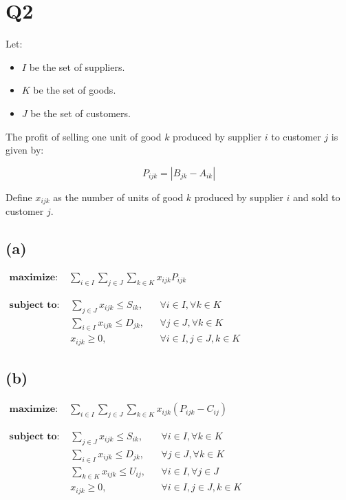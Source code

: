\section*{Q2}

Let:
\begin{itemize}
    \item \( I \) be the set of suppliers.
    \item \( K \) be the set of goods.
    \item \( J \) be the set of customers.
\end{itemize}

The profit of selling one unit of good \( k \) produced by supplier \( i \) to customer \( j \) is given by:

\[
P_{ijk} = |B_{jk} - A_{ik}|
\]

Define \( x_{ijk} \) as the number of units of good \( k \) produced by supplier \( i \) and sold to customer \( j \).

\subsection*{(a)}

$
\begin{aligned}
    \textbf{maximize: } & \sum_{i \in I} \sum_{j \in J} \sum_{k \in K} x_{ijk} P_{ijk}
\end{aligned}
$

$
\begin{aligned}
    \textbf{subject to: }
    & \sum_{j \in J} x_{ijk} \leq S_{ik}, && \forall i \in I, \forall k \in K \\
    & \sum_{i \in I} x_{ijk} \leq D_{jk}, && \forall j \in J, \forall k \in K \\
    & x_{ijk} \geq 0, && \forall i \in I, j \in J, k \in K
\end{aligned}
$

\subsection*{(b)}

$
\begin{aligned}
    \textbf{maximize: } & \sum_{i \in I} \sum_{j \in J} \sum_{k \in K} x_{ijk} (P_{ijk} - C_{ij})
\end{aligned}
$

$
\begin{aligned}
    \textbf{subject to: }
    & \sum_{j \in J} x_{ijk} \leq S_{ik}, && \forall i \in I, \forall k \in K \\
    & \sum_{i \in I} x_{ijk} \leq D_{jk}, && \forall j \in J, \forall k \in K \\
    & \sum_{k \in K} x_{ijk} \leq U_{ij}, && \forall i \in I, \forall j \in J \\
    & x_{ijk} \geq 0, && \forall i \in I, j \in J, k \in K
\end{aligned}
$


